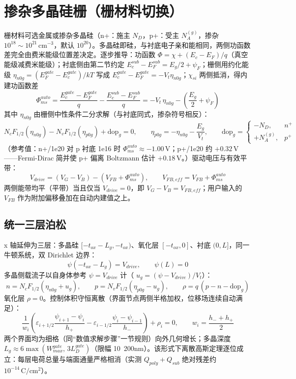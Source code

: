 \documentclass[11pt]{ctexart}
\begin{document}
\section{掺杂多晶硅栅（栅材料切换）}

栅材料可选金属或掺杂多晶硅（n+：施主 $N_D$，p+：受主 $N_A^{(g)}$，掺杂 $10^{18}\sim10^{21}\,\mathrm{cm^{-3}}$，默认 $10^{20}$）。多晶硅即硅，与衬底电子亲和能相同，两侧功函数差完全由费米能级位置差决定。逐步推导：功函数 $\Phi=\chi+(E_c-E_F)/q$（真空能级减费米能级）；衬底侧由第二节约定 $E_c^{sub}-E_F^{sub}=E_g/2+\psi_F$；栅侧用约化能级 $\eta_{n0g}=(E_F^{gate}-E_c^{gate})/kT$ 写成 $E_c^{gate}-E_F^{gate}=-V_t\eta_{n0g}$；$\chi_{si}$ 两侧抵消，得内建功函数差
\[\Phi_{ms}^{auto}=\frac{E_c^{gate}-E_F^{gate}}{q}-\frac{E_c^{sub}-E_F^{sub}}{q}=-V_t\,\eta_{n0g}-\left(\frac{E_g}{2}+\psi_F\right)\]
其中 $\eta_{n0g}$ 由栅侧中性条件二分求解（与衬底同式，掺杂符号相反）：
\[N_c F_{1/2}(\eta_{n0g})-N_v F_{1/2}(\eta_{p0g})+\mathrm{dop}_g=0,\qquad \eta_{p0g}=-\eta_{n0g}-\frac{E_g}{V_t},\qquad \mathrm{dop}_g=\begin{cases}-N_D,&n^+\\+N_A^{(g)},&p^+\end{cases}\]
（参考值：n+/1e20 对 p 衬底 1e16 时 $\Phi_{ms}^{auto}\approx-1.00\,\mathrm{V}$；p+/1e20 约 $+0.32\,\mathrm{V}$——Fermi-Dirac 简并使 p+ 偏离 Boltzmann 估计 $+0.18\,\mathrm{V}$。）驱动电压与有效平带：
\[V_{drive}=(V_G-V_B)-(V_{FB}+\Phi_{ms}^{auto}),\qquad V_{FB,eff}=V_{FB}+\Phi_{ms}^{auto}\]
两侧能带均平（平带）当且仅当 $V_{drive}=0$，即 $V_G-V_B=V_{FB,eff}$；用户输入的 $V_{FB}$ 作为附加偏移叠加在自动内建值之上。

\subsection{统一三层泊松}
x 轴延伸为三层：多晶硅 $[-t_{ox}-L_g,-t_{ox})$、氧化层 $[-t_{ox},0]$、衬底 $(0,L]$，同一牛顿系统，双 Dirichlet 边界：
\[\psi(-t_{ox}-L_g)=V_{drive},\qquad \psi(L)=0\]
多晶侧载流子以自身体参考 $\psi=V_{drive}$ 计（
\(u_g=(\psi-V_{drive})/V_t\)）：
\[n=N_c F_{1/2}(\eta_{n0g}+u_g),\qquad p=N_v F_{1/2}(\eta_{p0g}-u_g),\qquad \rho=q\,(p-n-\mathrm{dop}_g)\]
氧化层 $\rho=0$。控制体积守恒离散（界面节点两侧半格加权，位移场连续自动满足）：
\[\frac{1}{w_i}\left(\varepsilon_{i+1/2}\frac{\psi_{i+1}-\psi_i}{h_+}-\varepsilon_{i-1/2}\frac{\psi_i-\psi_{i-1}}{h_-}\right)+\rho_i=0,\qquad w_i=\frac{h_-+h_+}{2}\]
两个界面均为细格（同“数值求解步骤”一节规则）向外几何增长；多晶深度
\(L_g\approx 6\max(W_{max}^{gate},\,3L_D^{gate})\)（限幅 10~200nm）。该形式下离散高斯定理逐位成立：每层电荷总量与端面通量严格相消（实测 $Q_{poly}+Q_{sub}$ 绝对残差约 $10^{-14}\,\mathrm{C/cm^2}$）。
\end{document}
